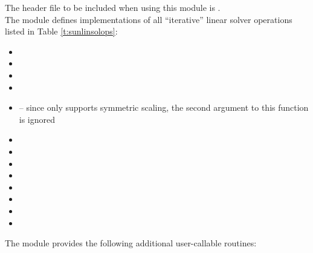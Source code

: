 \noindent The header file to be included when using this module 
is . \\
The {\sunlinsolpcg} module defines implementations of all
``iterative'' linear solver operations listed in Table
\ref{t:sunlinsolops}:
\begin{itemize}
\item {}
\item {}
\item {}
\item {}
\item {} -- since {\pcg} only
  supports symmetric scaling, the second {\nvector} argument to this
  function is ignored
\item {}
\item {}
\item {}
\item {}
\item {}
\item {}
\item {}
\item {}
\end{itemize}
The module {\sunlinsolpcg} provides the following additional
user-callable routines: 
